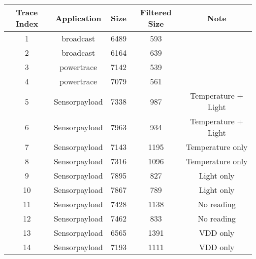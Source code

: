 \begin{table}[!ht]
\center
\begin{tabular}{|c|c|c|c|c|}
\hline
\textbf{Trace Index} & \textbf{Application} & \textbf{Size} & \textbf{Filtered Size} & \textbf{Note}              \\ \hline
1                    & broadcast            & 6489          & 593                    &                            \\ \hline
2                    & broadcast            & 6164          & 639                    &                            \\ \hline
3                    & powertrace           & 7142          & 539                    &                            \\ \hline
4                    & powertrace           & 7079          & 561                    &                            \\ \hline
5                    & Sensorpayload        & 7338          & 987                    & Temperature + Light        \\ \hline
6                    & Sensorpayload        & 7963          & 934                    & Temperature + Light        \\ \hline
7                    & Sensorpayload        & 7143          & 1195                   & Temperature only           \\ \hline
8                    & Sensorpayload        & 7316          & 1096                   & Temperature only           \\ \hline
9                    & Sensorpayload        & 7895          & 827                    & Light only                 \\ \hline
10                   & Sensorpayload        & 7867          & 789                    & Light only                 \\ \hline
11                   & Sensorpayload        & 7428          & 1138                   & No reading                 \\ \hline
12                   & Sensorpayload        & 7462          & 833                    & No reading                 \\ \hline
13                   & Sensorpayload        & 6565          & 1391                   & VDD only                   \\ \hline
14                   & Sensorpayload        & 7193          & 1111                   & VDD only                   \\ \hline

\end{tabular}
\end{table}
